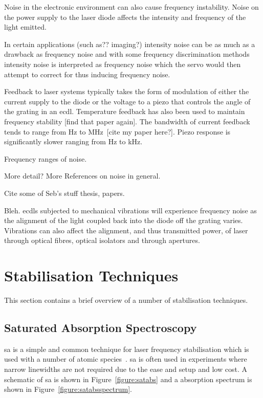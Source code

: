 Noise in the electronic environment can also cause frequency instability. Noise on the power supply to the laser diode affects the intensity and frequency of the light emitted.

In certain applications {\color{red}(such as?? imaging?)} intensity noise can be as much as a drawback as frequency noise and with some frequency discrimination methods intensity noise is interpreted as frequency noise which the servo would then attempt to correct for thus inducing frequency noise.

Feedback to laser systems typically takes the form of modulation of either the current supply to the diode or the voltage to a piezo that controls the angle of the grating in an \gls{ecdl}.
Temperature feedback has also been used to maintain frequency stability {\color{red}[find that paper again]}.
The bandwidth of current feedback tends to range from \unit[0]{Hz} to MHz~\cite{ludlow_compact_2007}{\color{red}[cite my paper here?]}.
Piezo response is significantly slower ranging from \unit[0]{Hz} to \unit[100]{kHz}.

{\color{red}Frequency ranges of noise.}

{\color{red}More detail? More References on noise in general.}

{\color{red}Cite some of Seb's stuff thesis\cite{saliba_cold_2011}, papers\cite{saliba_linewidths_2009, saliba_mode_2009}.}

Bleh.
\Glspl{ecdl} subjected to mechanical vibrations will experience frequency noise as the alignment of the light coupled back into the diode off the grating varies.
Vibrations can also affect the alignment, and thus transmitted power, of laser through optical fibres, optical isolators and through apertures.

\section{Stabilisation Techniques}

This section contains a brief overview of a number of stabilisation techniques.

\subsection{Saturated Absorption Spectroscopy}
\Gls{sa} is a simple and common technique for laser frequency stabilisation which is used with a number of atomic species~\cite{demtroder_laser_2003}.
\Gls{sa} is often used in experiments where narrow linewidths are not required due to the ease and setup and low cost.
A schematic of \gls{sa} is shown in Figure~\ref{figure:satabs} and a absorption spectrum is shown in Figure~\ref{figure:satabsspectrum}.

